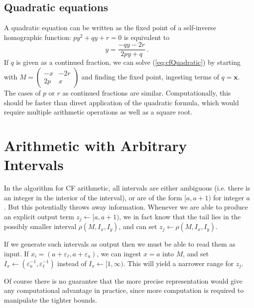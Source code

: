 \documentclass[11pt, oneside]{amsart}   	%
\begin{document}
\subsection{Quadratic equations}
A quadratic equation can be written as the fixed point of a self-inverse homographic function:
$
py^2 + qy + r = 0
$
is equivalent to
\begin{equation}\label{eq:cfQuadratic}
y = \frac{-qy - 2r}{2py + q}\ .
\end{equation}
If $q$ is given as a continued fraction, we can solve (\ref{eq:cfQuadratic}) by starting with $M= \left(
\begin{smallmatrix} 
-x & -2r \\ 
2p & x 
\end{smallmatrix}
\right)$ and finding the fixed point, ingesting terms of  $q=\mathbf{x}$. The cases of $p$ or $r$ as continued fractions are similar.
Computationally, this should be faster than direct application of the quadratic formula, which would require multiple arithmetic operations as well as a square root.


\section{Arithmetic with Arbitrary Intervals}
In the algorithm for CF arithmetic, all intervals are either ambiguous (i.e. there is an integer in the interior of the interval), or are of the form $[a,a+1)$ for integer $a$. But this potentially throws away information.
Whenever we are able to produce an explicit output term $z_j \leftarrow [a,a+1)$, we in fact know that the tail lies in the possibly smaller interval $\rho(M,I_x, I_y)$, and can set $z_j \leftarrow \rho(M,I_x, I_y)$.

If we generate such intervals as output then we must be able to read them as input. If $x_i = (a+\varepsilon_\ell, a+\varepsilon_u)$, we can ingest $x=a$ into $M$, and set $I_x \leftarrow (\varepsilon_u^{-1}, \varepsilon_\ell^{-1})$ instead of $I_x \leftarrow [1,\infty)$. This will yield a narrower range for $z_j$.

Of course there is no guarantee that the more precise representation would give any computational advantage in practice, since more computation is required to manipulate the tighter bounds.



\end{document}
